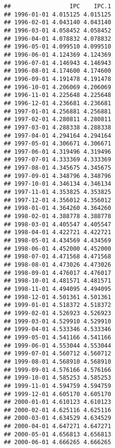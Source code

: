 \documentclass[
]{book}
\newenvironment{Shaded}{\begin{snugshade}}{\end{snugshade}}
\newcommand{\AttributeTok}[1]{\textcolor[rgb]{0.77,0.63,0.00}{#1}}
\newcommand{\DecValTok}[1]{\textcolor[rgb]{0.00,0.00,0.81}{#1}}
\newcommand{\FunctionTok}[1]{\textcolor[rgb]{0.00,0.00,0.00}{#1}}
\newcommand{\NormalTok}[1]{#1}
\newcommand{\OtherTok}[1]{\textcolor[rgb]{0.56,0.35,0.01}{#1}}
\newcommand{\SpecialCharTok}[1]{\textcolor[rgb]{0.00,0.00,0.00}{#1}}
\newcommand{\StringTok}[1]{\textcolor[rgb]{0.31,0.60,0.02}{#1}}
\begin{document}
\begin{Shaded}
\end{Shaded}

\begin{verbatim}
##                 IPC    IPC.1
## 1996-01-01 4.015125 4.015125
## 1996-02-01 4.043140 4.043140
## 1996-03-01 4.058452 4.058452
## 1996-04-01 4.078832 4.078832
## 1996-05-01 4.099510 4.099510
## 1996-06-01 4.124369 4.124369
## 1996-07-01 4.146943 4.146943
## 1996-08-01 4.174600 4.174600
## 1996-09-01 4.191478 4.191478
## 1996-10-01 4.206069 4.206069
## 1996-11-01 4.225648 4.225648
## 1996-12-01 4.236681 4.236681
## 1997-01-01 4.256881 4.256881
## 1997-02-01 4.280811 4.280811
## 1997-03-01 4.288338 4.288338
## 1997-04-01 4.294164 4.294164
## 1997-05-01 4.306671 4.306671
## 1997-06-01 4.319496 4.319496
## 1997-07-01 4.333369 4.333369
## 1997-08-01 4.345675 4.345675
## 1997-09-01 4.348796 4.348796
## 1997-10-01 4.346134 4.346134
## 1997-11-01 4.353825 4.353825
## 1997-12-01 4.356012 4.356012
## 1998-01-01 4.364260 4.364260
## 1998-02-01 4.388778 4.388778
## 1998-03-01 4.405547 4.405547
## 1998-04-01 4.422721 4.422721
## 1998-05-01 4.434569 4.434569
## 1998-06-01 4.452000 4.452000
## 1998-07-01 4.471568 4.471568
## 1998-08-01 4.473026 4.473026
## 1998-09-01 4.476017 4.476017
## 1998-10-01 4.481571 4.481571
## 1998-11-01 4.494095 4.494095
## 1998-12-01 4.501361 4.501361
## 1999-01-01 4.518372 4.518372
## 1999-02-01 4.526923 4.526923
## 1999-03-01 4.529910 4.529910
## 1999-04-01 4.533346 4.533346
## 1999-05-01 4.541166 4.541166
## 1999-06-01 4.553044 4.553044
## 1999-07-01 4.560712 4.560712
## 1999-08-01 4.568910 4.568910
## 1999-09-01 4.576166 4.576166
## 1999-10-01 4.585253 4.585253
## 1999-11-01 4.594759 4.594759
## 1999-12-01 4.605170 4.605170
## 2000-01-01 4.610123 4.610123
## 2000-02-01 4.625116 4.625116
## 2000-03-01 4.634529 4.634529
## 2000-04-01 4.647271 4.647271
## 2000-05-01 4.656813 4.656813
## 2000-06-01 4.666265 4.666265

\end{verbatim}
\end{document}
